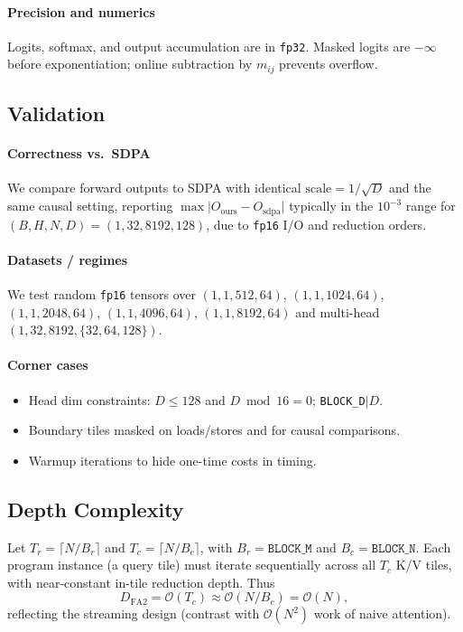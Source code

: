\documentclass[11pt]{article}
\begin{document}
\paragraph{Precision and numerics}
Logits, softmax, and output accumulation are in \texttt{fp32}. Masked logits are $-\infty$ before exponentiation; online subtraction by $m_{ij}$ prevents overflow.

\subsection{Validation}
\label{sec:validation}

\paragraph{Correctness vs.\ SDPA}
We compare forward outputs to SDPA with identical $\mathrm{scale}=1/\sqrt{D}$ and the same causal setting, reporting $\max\lvert O_{\mathrm{ours}}-O_{\mathrm{sdpa}}\rvert$ typically in the $10^{-3}$ range for $(B,H,N,D)=(1,32,8192,128)$, due to \texttt{fp16} I/O and reduction orders.

\paragraph{Datasets / regimes}
We test random \texttt{fp16} tensors over $(1,1,512,64)$, $(1,1,1024,64)$, $(1,1,2048,64)$, $(1,1,4096,64)$, $(1,1,8192,64)$ and multi-head $(1,32,8192,\{32,64,128\})$.

\paragraph{Corner cases}
\begin{itemize}
  \item Head dim constraints: $D\le 128$ and $D\bmod 16=0$; \texttt{BLOCK\_D}$\mid D$.
  \item Boundary tiles masked on loads/stores and for causal comparisons.
  \item Warmup iterations to hide one-time costs in timing.
\end{itemize}

\subsection{Depth Complexity}

Let $T_r=\lceil N/B_r\rceil$ and $T_c=\lceil N/B_c\rceil$, with $B_r=\texttt{BLOCK\_M}$ and $B_c=\texttt{BLOCK\_N}$. Each program instance (a query tile) must iterate sequentially across all $T_c$ K/V tiles, with near-constant in-tile reduction depth. Thus
\[
D_{\mathrm{FA2}}=\mathcal{O}(T_c)\approx \mathcal{O}(N/B_c)=\mathcal{O}(N),
\]
reflecting the streaming design (contrast with $\mathcal{O}(N^2)$ work of naive attention).
\end{document}

